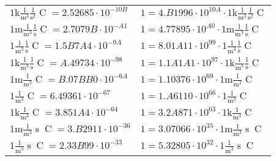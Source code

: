 \begin{center}
\begin{longtable}{l l}
{\color{gray}$1 \bm{\mathrm{ k}}\frac1{\operatorname{m}^3}\frac1{\operatorname{s}^2}{\operatorname{C}}{} = 2.52685\cdot10^{-10B} $}   & {\color{gray}$ 1 = 4.B1996\cdot10^{10A} \cdot 1 \bm{\mathrm{ k}}\frac1{\operatorname{m}^3}\frac1{\operatorname{s}^2}{\operatorname{C}}{}$}  \\
{\color{gray}$1 \bm{\mathrm{ m}}\frac1{\operatorname{m}^3}\frac1{\operatorname{s}}{\operatorname{C}}{} = 2.7079B\cdot10^{-A1} $}   & {\color{gray}$ 1 = 4.77895\cdot10^{A0} \cdot 1 \bm{\mathrm{ m}}\frac1{\operatorname{m}^3}\frac1{\operatorname{s}}{\operatorname{C}}{}$}  \\
{\color{black}$1 \bm{\mathrm{ }}\frac1{\operatorname{m}^3}\frac1{\operatorname{s}}{\operatorname{C}}{} = 1.5B7A4\cdot10^{-9A} $}   & {\color{black}$ 1 = 8.01A11\cdot10^{99} \cdot 1 \bm{\mathrm{ }}\frac1{\operatorname{m}^3}\frac1{\operatorname{s}}{\operatorname{C}}{}$}  \\
{\color{gray}$1 \bm{\mathrm{ k}}\frac1{\operatorname{m}^3}\frac1{\operatorname{s}}{\operatorname{C}}{} = A.49734\cdot10^{-98} $}   & {\color{gray}$ 1 = 1.1A1A1\cdot10^{97} \cdot 1 \bm{\mathrm{ k}}\frac1{\operatorname{m}^3}\frac1{\operatorname{s}}{\operatorname{C}}{}$}  \\
{\color{gray}$1 \bm{\mathrm{ m}}\frac1{\operatorname{m}^3}{}{\operatorname{C}}{} = B.07BB0\cdot10^{-6A} $}   & {\color{gray}$ 1 = 1.10376\cdot10^{69} \cdot 1 \bm{\mathrm{ m}}\frac1{\operatorname{m}^3}{}{\operatorname{C}}{}$}  \\
{\color{black}$1 \bm{\mathrm{ }}\frac1{\operatorname{m}^3}{}{\operatorname{C}}{} = 6.49361\cdot10^{-67} $}   & {\color{black}$ 1 = 1.A6110\cdot10^{66} \cdot 1 \bm{\mathrm{ }}\frac1{\operatorname{m}^3}{}{\operatorname{C}}{}$}  \\
{\color{gray}$1 \bm{\mathrm{ k}}\frac1{\operatorname{m}^3}{}{\operatorname{C}}{} = 3.851A4\cdot10^{-64} $}   & {\color{gray}$ 1 = 3.2A871\cdot10^{63} \cdot 1 \bm{\mathrm{ k}}\frac1{\operatorname{m}^3}{}{\operatorname{C}}{}$}  \\
{\color{gray}$1 \bm{\mathrm{ m}}\frac1{\operatorname{m}^3}{\operatorname{s}}{\operatorname{C}}{} = 3.B2911\cdot10^{-36} $}   & {\color{gray}$ 1 = 3.07066\cdot10^{35} \cdot 1 \bm{\mathrm{ m}}\frac1{\operatorname{m}^3}{\operatorname{s}}{\operatorname{C}}{}$}  \\
{\color{black}$1 \bm{\mathrm{ }}\frac1{\operatorname{m}^3}{\operatorname{s}}{\operatorname{C}}{} = 2.33B99\cdot10^{-33} $}   & {\color{black}$ 1 = 5.32805\cdot10^{32} \cdot 1 \bm{\mathrm{ }}\frac1{\operatorname{m}^3}{\operatorname{s}}{\operatorname{C}}{}$}  \\

\end{longtable}
\end{center}
